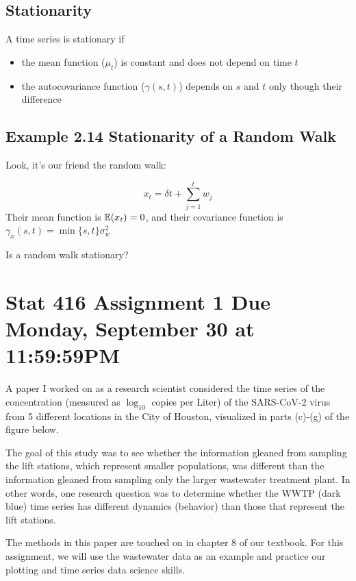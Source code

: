 \documentclass[
  letterpaper,
  DIV=11,
  numbers=noendperiod]{scrreprt}
\providecommand{\tightlist}{%
  \setlength{\itemsep}{0pt}\setlength{\parskip}{0pt}}\usepackage{longtable,booktabs,array}
\begin{document}
\section{Stationarity}\label{stationarity}

A time series is stationary if

\begin{itemize}
\tightlist
\item
  the mean function (\(\mu_t\)) is constant and does not depend on time
  \(t\)
\item
  the autocovariance function (\(\gamma(s,t)\)) depends on \(s\) and
  \(t\) only though their difference
\end{itemize}

\section{Example 2.14 Stationarity of a Random
Walk}\label{example-2.14-stationarity-of-a-random-walk}

Look, it's our friend the random walk:

\[
x_t = \delta t + \sum_{j = 1}^t w_j
\] Their mean function is \({\mathbb{E}}(x_t) = 0\), and their covariance function
is \(\gamma_x(s, t) = \min\{s,t\}\sigma^2_w\)

Is a random walk stationary?

\chapter{Stat 416 Assignment 1 Due Monday, September 30 at
11:59:59PM}\label{stat-416-assignment-1-due-monday-september-30-at-115959pm}

A paper I worked on as a research scientist considered the time series
of the concentration (measured as \(\log_{10}\) copies per Liter) of the
SARS-CoV-2 virus from 5 different locations in the City of Houston,
visualized in parts (c)-(g) of the figure below.

The goal of this study was to see whether the information gleaned from
sampling the lift stations, which represent smaller populations, was
different than the information gleaned from sampling only the larger
wastewater treatment plant. In other words, one research question was to
determine whether the WWTP (dark blue) time series has different
dynamics (behavior) than those that represent the lift stations.

The methods in this paper are touched on in chapter 8 of our textbook.
For this assignment, we will use the wastewater data as an example and
practice our plotting and time series data science skills.
\end{document}
